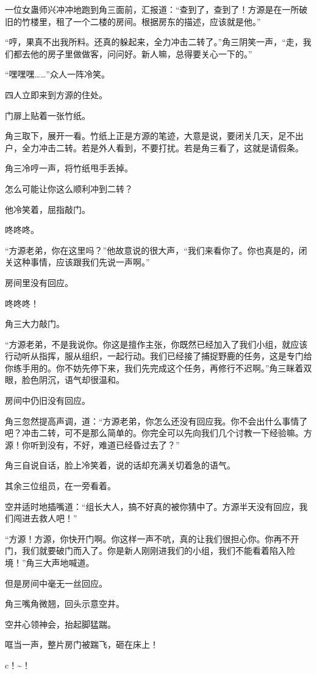 \begin{this_body}
一位女蛊师兴冲冲地跑到角三面前，汇报道：“查到了，查到了！方源是在一所破旧的竹楼里，租了一个二楼的房间。根据房东的描述，应该就是他。”

“哼，果真不出我所料。还真的躲起来，全力冲击二转了。”角三阴笑一声，“走，我们都去他的房子里做做客，问问好。新人嘛，总得要关心一下的。”

“嘿嘿嘿……”众人一阵冷笑。

四人立即来到方源的住处。

门扉上贴着一张竹纸。

角三取下，展开一看。竹纸上正是方源的笔迹，大意是说，要闭关几天，足不出户，全力冲击二转。若是外人看到，不要打扰。若是角三看了，这就是请假条。

角三冷哼一声，将竹纸甩手丢掉。

怎么可能让你这么顺利冲到二转？

他冷笑着，屈指敲门。

咚咚咚。

“方源老弟，你在这里吗？”他故意说的很大声，“我们来看你了。你也真是的，闭关这种事情，应该跟我们先说一声啊。”

房间里没有回应。

咚咚咚！

角三大力敲门。

“方源老弟，不是我说你。你这是擅作主张，你既然已经加入了我们小组，就应该行动听从指挥，服从组织，一起行动。我们已经接了捕捉野鹿的任务，这是专门给你练手用的。你不妨先停下来，我们先完成这个任务，再修行不迟啊。”角三眯着双眼，脸色阴沉，语气却很温和。

房间中仍旧没有回应。

角三忽然提高声调，道：“方源老弟，你怎么还没有回应我。你不会出什么事情了吧？冲击二转，可不是那么简单的。你完全可以先向我们几个讨教一下经验嘛。方源！你听到没有，不好，难道已经昏过去了？”

角三自说自话，脸上冷笑着，说的话却充满关切着急的语气。

其余三位组员，在一旁看着。

空井适时地插嘴道：“组长大人，搞不好真的被你猜中了。方源半天没有回应，我们闯进去救人吧！”

“方源！方源，你快开门啊。你这样一声不吭，真的让我们很担心你。你再不开门，我们就要破门而入了。你是新人刚刚进我们的小组，我们不能看着陷入险境！”角三大声地喊道。

但是房间中毫无一丝回应。

角三嘴角微翘，回头示意空井。

空井心领神会，抬起脚猛踹。

哐当一声，整片房门被踹飞，砸在床上！

c！\~{}！

\end{this_body}

